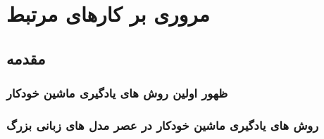 \chapter{مروری بر کارهای مرتبط}
\thispagestyle{empty}

\section{مقدمه}
\subsection{ظهور اولین روش های یادگیری ماشین خودکار}
\subsection{روش های یادگیری ماشین خودکار در عصر مدل های زبانی بزرگ}




